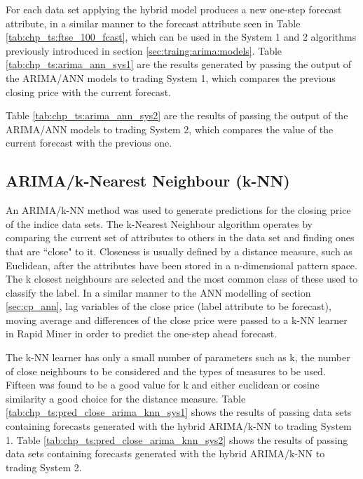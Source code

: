 For each data set applying the hybrid model produces a new one-step forecast attribute, in a similar manner to the forecast attribute seen in Table \ref{tab:chp_ts:ftse_100_fcast}, which can be used in the System 1 and 2 algorithms previously introduced in section \ref{sec:traing:arima:models}. Table \ref{tab:chp_ts:arima_ann_sys1} are the results generated by passing the output of the ARIMA/ANN models to trading System 1, which compares the previous closing price with the current forecast.

\label{todo:chp5:tab:chp_ts:arima_hybrid_reg}



Table \ref{tab:chp_ts:arima_ann_sys2} are the results of passing the output of the ARIMA/ANN models to trading System 2, which compares the value of the current forecast with the previous one.



\subsection{ARIMA/k-Nearest Neighbour (k-NN)}
An ARIMA/k-NN method was used to generate predictions for the closing price of the indice data sets. The k-Nearest Neighbour algorithm operates by comparing the current set of attributes to others in the data set and finding ones that are \textquotedblleft close" to it. Closeness is usually defined by a distance measure, such as Euclidean, after the attributes have been stored in a n-dimensional pattern space. The k closest neighbours are selected and the most common class of these used to classify the label. In a similar manner to the ANN modelling of section \ref{sec:cp_ann}, lag variables of the close price (label attribute to be forecast), moving average and differences of the close price were passed to a k-NN learner in Rapid Miner in order to predict the one-step ahead forecast. 

The k-NN learner has only a small number of parameters such as k, the number of close neighbours to be considered and the types of measures to be used. Fifteen was found to be a good value for k and either euclidean or cosine similarity a good choice for the distance measure. Table \ref{tab:chp_ts:pred_close_arima_knn_sys1} shows the results of passing data sets containing forecasts generated with the hybrid ARIMA/k-NN to trading System 1. Table \ref{tab:chp_ts:pred_close_arima_knn_sys2} shows the results of passing data sets containing forecasts generated with the hybrid ARIMA/k-NN to trading System 2.

